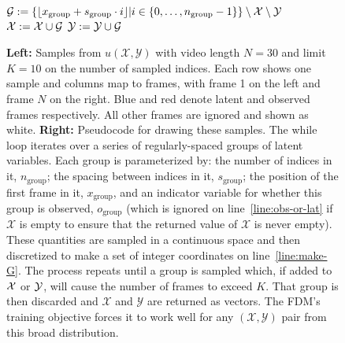 \begin{figure}
\begin{minipage}[t]{0.63\textwidth}
\begin{algorithm}[H]
\begin{algorithmic}[1]
        \State $\mathcal{G} := \{\lfloor x_\text{group} + s_\text{group} \cdot i \rfloor | i \in \{0,\ldots,n_\text{group}-1\} \} \setminus \mathcal{X} \setminus \mathcal{Y}$ \label{line:make-G}
            \State {}
         \label{line:obs-or-lat}
            \State $\mathcal{X} := \mathcal{X} \cup \mathcal{G}$
        \Else
            \State $\mathcal{Y} := \mathcal{Y} \cup \mathcal{G}$
        \EndIf
    \EndWhile
    \end{algorithmic}
\end{algorithm}
\end{minipage}
\caption{\textbf{Left:} Samples from $u(\mathcal{X},\mathcal{Y})$ with video length $N=30$ and limit $K=10$ on the number of sampled indices. Each row shows one sample and columns map to frames, with frame 1 on the left and frame $N$ on the right. Blue and red denote latent and observed frames respectively. All other frames are ignored and shown as white. \textbf{Right:} Pseudocode for drawing these samples. The while loop iterates over a series of regularly-spaced groups of latent variables. Each group is parameterized by: the number of indices in it, $n_\text{group}$; the spacing between indices in it, $s_\text{group}$; the position of the first frame in it, $x_\text{group}$, and an indicator variable for whether this group is observed, $o_\text{group}$ (which is ignored on line~\ref{line:obs-or-lat} if $\mathcal{X}$ is empty to ensure that the returned value of $\mathcal{X}$ is never empty). These quantities are sampled in a continuous space and then discretized to make a set of integer coordinates on line~\ref{line:make-G}. The process repeats until a group is sampled which, if added to $\mathcal{X}$ or $\mathcal{Y}$, will cause the number of frames to exceed $K$. That group is then discarded and $\mathcal{X}$ and $\mathcal{Y}$ are returned as vectors. The FDM's training objective forces it to work well for any $(\mathcal{X},\mathcal{Y})$ pair from this broad distribution.
}
\label{fig:training-distribution}
\end{figure}


